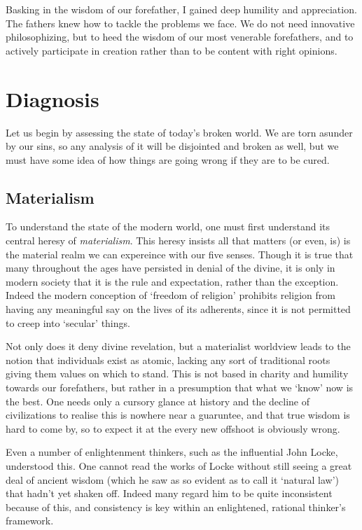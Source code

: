 \documentclass[letterpaper]{article}
\begin{document}
Basking in the wisdom of our forefather, I gained deep humility and appreciation. The fathers knew how to tackle the problems we face. We do not need innovative philosophizing, but to heed the wisdom of our most venerable forefathers, and to actively participate in creation rather than to be content with right opinions.
\fi

\section{Diagnosis}

Let us begin by assessing the state of today's broken world. We are torn asunder by our sins, so any analysis of it will be disjointed and broken as well, but we must have some idea of how things are going wrong if they are to be cured.

\subsection{Materialism}

To understand the state of the modern world, one must first understand its central heresy of \textit{materialism}. This heresy insists all that matters (or even, is) is the material realm we can expereince with our five senses. Though it is true that many throughout the ages have persisted in denial of the divine, it is only in modern society that it is the rule and expectation, rather than the exception. Indeed the modern conception of `freedom of religion' prohibits religion from having any meaningful say on the lives of its adherents, since it is not permitted to creep into `secular' things.

Not only does it deny divine revelation, but a materialist worldview leads to the notion that individuals exist as atomic, lacking any sort of traditional roots giving them values on which to stand. This is not based in charity and humility towards our forefathers, but rather in a presumption that what we `know' now is the best. One needs only a cursory glance at history and the decline of civilizations to realise this is nowhere near a guaruntee, and that true wisdom is hard to come by, so to expect it at the every new offshoot is obviously wrong.

Even a number of enlightenment thinkers, such as the influential John Locke, understood this. One cannot read the works of Locke without still seeing a great deal of ancient wisdom (which he saw as so evident as to call it `natural law') that hadn't yet shaken off. Indeed many regard him to be quite inconsistent because of this, and consistency is key within an enlightened, rational thinker's framework.
\end{document}
